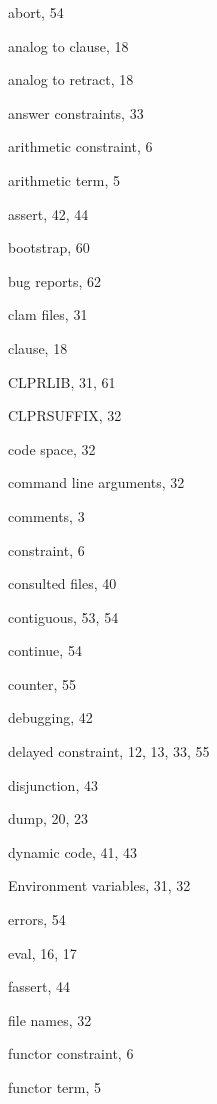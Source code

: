 \begin{theindex}
  \indexspace

  \item abort, 54
  \item analog to clause, 18
  \item analog to retract, 18
  \item answer constraints, 33
  \item arithmetic constraint, 6
  \item arithmetic term, 5
  \item assert, 42, 44

  \indexspace

  \item bootstrap, 60
  \item bug reports, 62

  \indexspace

  \item clam files, 31
  \item clause, 18
  \item CLPRLIB, 31, 61
  \item CLPRSUFFIX, 32
  \item code space, 32
  \item command line arguments, 32
  \item comments, 3
  \item constraint, 6
  \item consulted files, 40
  \item contiguous, 53, 54
  \item continue, 54
  \item counter, 55

  \indexspace

  \item debugging, 42
  \item delayed constraint, 12, 13, 33, 55
  \item disjunction, 43
  \item dump, 20, 23
  \item dynamic code, 41, 43

  \indexspace

  \item Environment variables, 31, 32
  \item errors, 54
  \item eval, 16, 17

  \indexspace

  \item fassert, 44
  \item file names, 32
  \item functor constraint, 6
  \item functor term, 5


\end{theindex}

